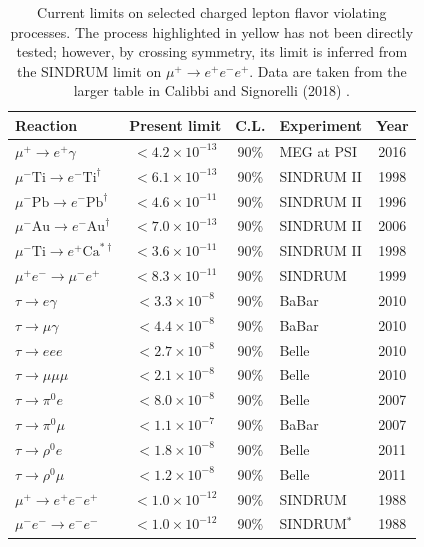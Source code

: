 \documentclass[12pt]{article}
\begin{document}
\begin{table}[h!]
\centering
\caption{Current limits on selected charged lepton flavor violating processes. The process highlighted in yellow has not been directly tested; however, by crossing symmetry, its limit is inferred from the SINDRUM limit on $\mu^+ \to e^+e^-e^+$. Data are taken from the larger table in Calibbi and Signorelli (2018) \cite{CalibbiSignorelli2018CLFVIntro}.}
\label{tab:clfv_limits}
\begin{tabular}{l c c l c}
\hline
Reaction & Present limit & C.L. & Experiment & Year \\
\hline
$\mu^+ \to e^+\gamma$
& $< 4.2 \times 10^{-13}$ & 90\% & MEG at PSI & 2016 \\

$\mu^- \mathrm{Ti} \to e^- \mathrm{Ti}^{\dagger}$
& $< 6.1 \times 10^{-13}$ & 90\% & SINDRUM II & 1998 \\

$\mu^- \mathrm{Pb} \to e^- \mathrm{Pb}^{\dagger}$
& $< 4.6 \times 10^{-11}$ & 90\% & SINDRUM II & 1996 \\

$\mu^- \mathrm{Au} \to e^- \mathrm{Au}^{\dagger}$
& $< 7.0 \times 10^{-13}$ & 90\% & SINDRUM II & 2006 \\

$\mu^- \mathrm{Ti} \to e^+ \mathrm{Ca}^{*\dagger}$
& $< 3.6 \times 10^{-11}$ & 90\% & SINDRUM II & 1998 \\

$\mu^+e^- \to \mu^-e^+$
& $< 8.3 \times 10^{-11}$ & 90\% & SINDRUM & 1999 \\

$\tau \to e\gamma$
& $< 3.3 \times 10^{-8}$ & 90\% & BaBar & 2010 \\

$\tau \to \mu\gamma$
& $< 4.4 \times 10^{-8}$ & 90\% & BaBar & 2010 \\

$\tau \to eee$
& $< 2.7 \times 10^{-8}$ & 90\% & Belle & 2010 \\

$\tau \to \mu\mu\mu$
& $< 2.1 \times 10^{-8}$ & 90\% & Belle & 2010 \\

$\tau \to \pi^0e$
& $< 8.0 \times 10^{-8}$ & 90\% & Belle & 2007 \\

$\tau \to \pi^0\mu$
& $< 1.1 \times 10^{-7}$ & 90\% & BaBar & 2007 \\

$\tau \to \rho^0e$
& $< 1.8 \times 10^{-8}$ & 90\% & Belle & 2011 \\

$\tau \to \rho^0\mu$
& $< 1.2 \times 10^{-8}$ & 90\% & Belle & 2011 \\
\hline

$\mu^+ \to e^+e^-e^+$
& $< 1.0 \times 10^{-12}$ & 90\% & SINDRUM & 1988 \\

\rowcolor{yellow!25}
$\mu^-e^- \to e^-e^-$
& $< 1.0 \times 10^{-12}$ & 90\% & SINDRUM$^{*}$ & 1988 \\
\hline
\end{tabular}
\end{table}
\end{document}
